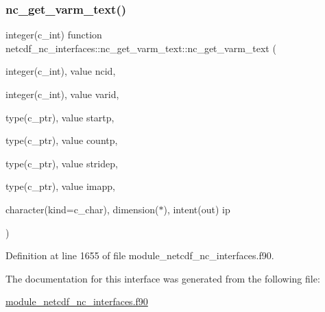 \subsubsection{\texorpdfstring{nc\+\_\+get\+\_\+varm\+\_\+text()}{nc\_get\_varm\_text()}}
{\footnotesize\ttfamily integer(c\+\_\+int) function netcdf\+\_\+nc\+\_\+interfaces\+::nc\+\_\+get\+\_\+varm\+\_\+text\+::nc\+\_\+get\+\_\+varm\+\_\+text (\begin{DoxyParamCaption}\item[{integer(c\+\_\+int), value}]{ncid,  }\item[{integer(c\+\_\+int), value}]{varid,  }\item[{type(c\+\_\+ptr), value}]{startp,  }\item[{type(c\+\_\+ptr), value}]{countp,  }\item[{type(c\+\_\+ptr), value}]{stridep,  }\item[{type(c\+\_\+ptr), value}]{imapp,  }\item[{character(kind=c\+\_\+char), dimension($\ast$), intent(out)}]{ip }\end{DoxyParamCaption})}



Definition at line 1655 of file module\+\_\+netcdf\+\_\+nc\+\_\+interfaces.\+f90.



The documentation for this interface was generated from the following file\+:\begin{DoxyCompactItemize}
\item 
\hyperlink{module__netcdf__nc__interfaces_8f90}{module\+\_\+netcdf\+\_\+nc\+\_\+interfaces.\+f90}\end{DoxyCompactItemize}
